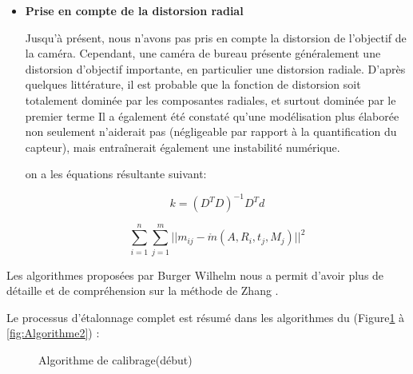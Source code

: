 \begin{itemize}[label={\Huge$\star$}]
 \item \textbf{Prise en compte de la distorsion radial	
 }
 
 Jusqu’à présent, nous n’avons pas pris en compte la distorsion de l’objectif 
  de la caméra. Cependant, une caméra de bureau présente généralement 
 une distorsion d'objectif importante, en particulier une distorsion radiale. 
  D'après quelques littérature, il est probable que la fonction de distorsion soit totalement dominée par les 
 composantes radiales, et surtout dominée par le premier terme Il a également été constaté qu'une modélisation plus élaborée non seulement n'aiderait pas (négligeable par rapport à la quantification du 
 capteur), mais entraînerait également une instabilité numérique.
 
 on a les équations résultante suivant:
 
 \begin{equation}
 	k
 	=
 	(D^{T}D)^{-1}D^{T}d
 	\label{eq:radial}
 \end{equation}	
 	
 	\begin{equation}
 		\sum_{i=1}^{n} \sum_{j=1}^{m} 
 		||m_{ij}-\mathring{m}
 		(A,R_{i},t_{j},M_{j})||^{2}
 		\label{eq:radial2}
 	\end{equation}
 	
 \end{itemize} 
 
 Les algorithmes proposées par Burger Wilhelm nous a permit d'avoir plus de détaille et de compréhension sur la méthode de Zhang \cite{burger_zhangs_2016}.
 
 Le processus d’étalonnage complet est résumé dans les algorithmes du (Figure\ref{fig:Algorithme1} à \ref{fig:Algorithme2}) :
 
 
 \begin{figure}[H]%
 	\center%
 	\setlength{\fboxsep}{5pt}%
 	\setlength{\fboxrule}{0.5pt}%
 	\caption[Algorithme de calibrage(début)]{Algorithme de calibrage(début)}
 	\label{fig:Algorithme1}
 \end{figure}
 
